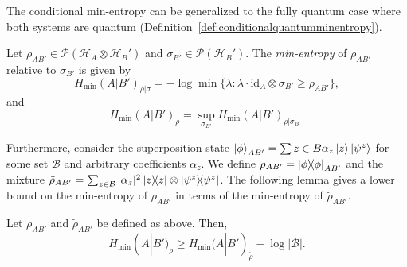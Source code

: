 
The conditional min-entropy can be generalized to the fully quantum case where both systems are quantum (Definition~\ref{def:conditionalquantumminentropy}).

\begin{definition}
\label{def:conditionalquantumminentropy}
Let $\rho_{A B'} \in \mathcal{P}(\mathcal{H}_A \otimes \mathcal{H}_B')$ and $\sigma_{B'} \in \mathcal{P}(\mathcal{H}_B')$. The \textit{min-entropy} of $\rho_{A B'}$ relative to $\sigma_{B'}$ is given by
$$H_{\text{min}}(A | B')_{\rho|\sigma} = -\log \min\{ \lambda : \lambda \cdot \text{id}_A \otimes \sigma_{B'} \geq \rho_{A B'} \},$$
and 
$$ H_{\text{min}}(A | B')_{\rho} = \sup_{\sigma_{B'}} H_{\text{min}}(A | B')_{\rho|\sigma_{B'}}.$$
\end{definition}

Furthermore, consider the superposition state $\ket{\phi}_{AB'} = \sum{z\in B}\alpha_z\ket{z} \ket{\psi^z}$ for some set $\mathcal{B}$ and arbitrary coefficients $\alpha_z$. We define $\rho_{AB'} = \ketbra{\phi}_{AB'}$ and the mixture $\tilde{\rho}_{AB'} = \sum_{z\in \mathcal{B}} |\alpha_z|^2 \ketbra{z} \otimes \ketbra{\psi^z}$. The following lemma gives a lower bound on the min-entropy of $\rho_{AB'}$ in terms of the min-entropy of $\tilde{\rho}_{AB'} $.


\begin{lemma}
Let $\rho_{AB'}$ and $\tilde{\rho}_{AB'}$ be defined as above. Then,
$$H_{\text{min}}(A | B')_{\rho} \geq H_{\text{min}}(A | B')_{\tilde{\rho}} - \log |\mathcal{B}|.$$
\label{lemma:renner_lower_bound}
\end{lemma}

